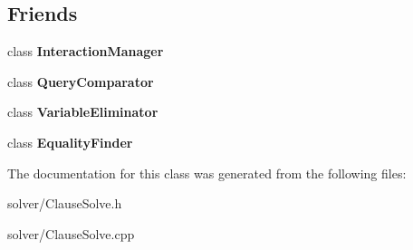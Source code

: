 \subsection*{\-Friends}
\begin{DoxyCompactItemize}
\item 
\hypertarget{classClauseSolve_ace1aed02802f62c643a37b8a67e67bee}{class {\bfseries \-Interaction\-Manager}}\label{classClauseSolve_ace1aed02802f62c643a37b8a67e67bee}

\item 
\hypertarget{classClauseSolve_a16b09189cdaf88044be661f54a1313a7}{class {\bfseries \-Query\-Comparator}}\label{classClauseSolve_a16b09189cdaf88044be661f54a1313a7}

\item 
\hypertarget{classClauseSolve_aa97b604ea37345da6b2414f0892e2664}{class {\bfseries \-Variable\-Eliminator}}\label{classClauseSolve_aa97b604ea37345da6b2414f0892e2664}

\item 
\hypertarget{classClauseSolve_ac354b9f1700ae74fadac1ee9efad4475}{class {\bfseries \-Equality\-Finder}}\label{classClauseSolve_ac354b9f1700ae74fadac1ee9efad4475}

\end{DoxyCompactItemize}


\-The documentation for this class was generated from the following files\-:\begin{DoxyCompactItemize}
\item 
solver/\-Clause\-Solve.\-h\item 
solver/\-Clause\-Solve.\-cpp\end{DoxyCompactItemize}
